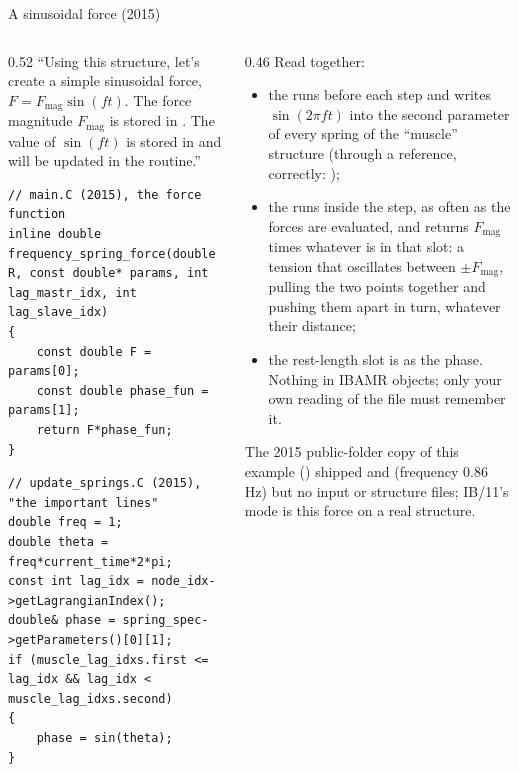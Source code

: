 \documentclass[aspectratio=169,11pt]{beamer}
\begin{document}
\begin{frame}[fragile]{A sinusoidal force (2015)}
\label{fr:sinus}
\begin{columns}[T,onlytextwidth]
\begin{column}{0.52\textwidth}
\footnotesize ``Using this structure, let's create a simple sinusoidal force, $F = F_{\mathrm{mag}}\sin(ft)$. The force magnitude $F_{\mathrm{mag}}$ is stored in . The value of $\sin(ft)$ is stored in  and will be updated in the  routine.''
\begin{lstlisting}[style=cpptiny]
// main.C (2015), the force function
inline double frequency_spring_force(double R, const double* params, int lag_mastr_idx, int lag_slave_idx)
{
    const double F = params[0];
    const double phase_fun = params[1];
    return F*phase_fun;
}
\end{lstlisting}
\begin{lstlisting}[style=cpptiny]
// update_springs.C (2015), "the important lines"
double freq = 1;
double theta = freq*current_time*2*pi;
const int lag_idx = node_idx->getLagrangianIndex();
double& phase = spring_spec->getParameters()[0][1];
if (muscle_lag_idxs.first <= lag_idx && lag_idx < muscle_lag_idxs.second)
{
    phase = sin(theta);
}
\end{lstlisting}
\end{column}
\begin{column}{0.46\textwidth}
\scriptsize Read together:
\begin{itemize}
  \item the  runs before each step and writes $\sin(2\pi f t)$ into the second parameter of every spring of the ``muscle'' structure (through a reference, correctly: );
  \item the  runs inside the step, as often as the forces are evaluated, and returns $F_{\mathrm{mag}}$ times whatever is in that slot: a tension that oscillates between $\pm F_{\mathrm{mag}}$, pulling the two points together and pushing them apart in turn, whatever their distance;
  \item the rest-length slot is  as the phase. Nothing in IBAMR objects; only your own reading of the file must remember it.
\end{itemize}
\scriptsize The 2015 public-folder copy of this example () shipped  and  (frequency $0.86$ Hz) but no input or structure files; IB/11's  mode is this force on a real structure.
\end{column}
\end{columns}
\end{frame}
\end{document}
